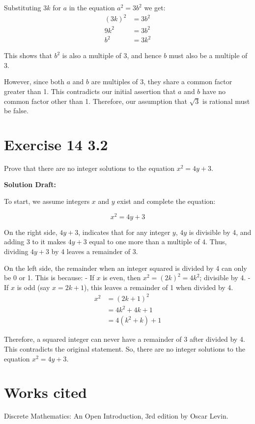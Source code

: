 \documentclass{article}
\begin{document}
Substituting \(3k\) for \(a\) in the equation \(a^2 = 3b^2\) we get:
\begin{align*}
    (3k)^2 &= 3b^2 \\
    9k^2 &= 3b^2 \\
    b^2 &= 3k^2
    \end{align*}
    

This shows that \(b^2\) is also a multiple of 3, and hence \(b\) must also be a multiple of 3.

However, since both \(a\) and \(b\) are multiples of 3, they share a common factor greater than 1. This contradicts our initial assertion that \(a\) and \(b\) have no common factor other than 1. Therefore, our assumption that \(\sqrt{3}\) is rational must be false.


\section*{Exercise 14 3.2}  

Prove that there are no integer solutions to the equation \(x^2 = 4y + 3\).


\vspace{0.5cm}
\noindent\textbf{Solution Draft:} 
\vspace{0.2cm}

To start, we assume integers $x$ and $y$ exist and complete the equation:

\[x^2 = 4y + 3\]

On the right side, $4y + 3$, indicates that for any integer $y$, $4y$ is divisible by 4, and adding 3 to it makes $4y + 3$ equal to one more than a multiple of 4. Thus, dividing $4y + 3$ by 4 leaves a remainder of 3.

On the left side, the remainder when an integer squared is divided by 4 can only be 0 or 1. This is because:
- If $x$ is even, then $x^2 = (2k)^2 = 4k^2$; divisible by 4.
- If $x$ is odd (say $x = 2k + 1$), this leaves a remainder of 1 when divided by 4.
\begin{align*}
    x^2 &= (2k + 1)^2 \\
    &= 4k^2 + 4k + 1 \\
    &= 4(k^2 + k) + 1
    \end{align*}


Therefore, a squared integer can never have a remainder of 3 after divided by 4. This contradicts the original statement. So, there are no integer solutions to the equation $x^2 = 4y + 3$.



\section*{Works cited}
Discrete Mathematics: An Open Introduction, 3rd edition by Oscar Levin.
\end{document}
